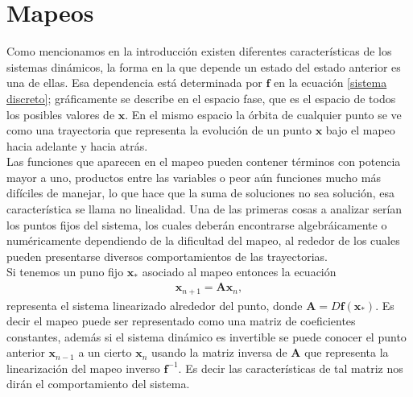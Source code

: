 \section{Mapeos}
Como mencionamos en la introducción existen diferentes características de los sistemas dinámicos, la forma en la que depende un estado del estado anterior es una de ellas. Esa dependencia está determinada por $\mathbf{f}$ en la ecuación \eqref{sistema discreto}; gráficamente se describe en el espacio fase, que es el espacio de todos los posibles valores de $\pmb x$. En el mismo espacio la órbita de cualquier punto se ve como una trayectoria que representa la evolución de un punto $\pmb x$ bajo el mapeo hacia adelante y hacia atrás. \\

Las funciones que aparecen en el mapeo pueden contener términos con potencia mayor a uno, productos entre las variables o peor aún funciones mucho más difíciles de manejar, lo que hace que la suma de soluciones no sea solución, esa característica se llama no linealidad. Una de las primeras cosas a analizar serían los puntos fijos del sistema, los cuales deberán encontrarse algebráicamente o numéricamente dependiendo de la dificultad del mapeo, al rededor de los cuales pueden presentarse diversos comportamientos de las trayectorias.\\

Si tenemos un puno fijo $\mathbf{x}_{*}$ asociado al mapeo entonces la ecuación
\begin{eqnarray}
\mathbf{x}_{n+1} =\mathbf{A}\mathbf{x}_{n},
\end{eqnarray}
representa el sistema linearizado alrededor del punto, donde $\mathbf{A}=D\mathbf{f}(\mathbf{x}_{*})$. Es decir el mapeo puede ser representado como una matriz de coeficientes constantes, además si el sistema dinámico es invertible se puede conocer el punto anterior $\mathbf{x}_{n-1}$ a un cierto $\mathbf{x}_{n}$ usando la matriz inversa de $\mathbf{A}$ que representa la linearización del mapeo inverso $\mathbf{f}^{-1}$. Es decir las características de tal matriz nos dirán el comportamiento del sistema. \\

